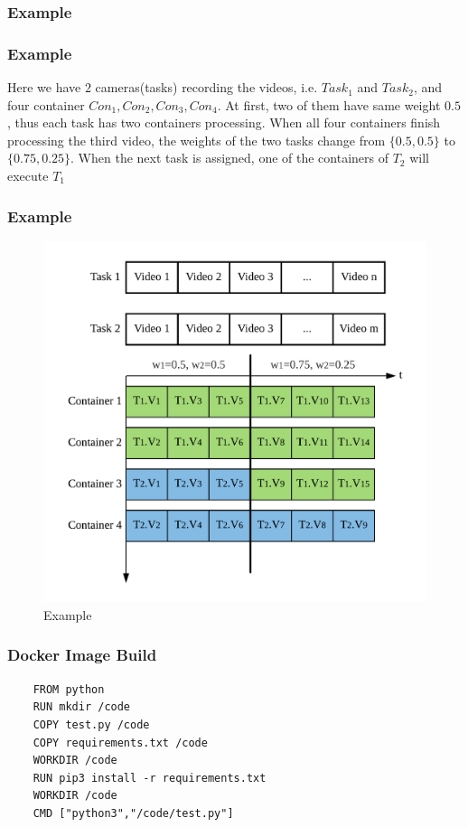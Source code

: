 \documentclass{beamer}
\begin{document}
\subsubsection{Example}
\begin{frame}
    \frametitle{Example} 
    Here we have $2$ cameras(tasks) recording the videos, i.e. $Task_1$ and $Task_2$, and four container $Con_1,Con_2,Con_3,Con_4$. At first, two of them have same weight $0.5$, thus each task has two containers processing. When all four containers finish processing the third video, the weights of the two tasks change from $\{0.5,0.5\}$ to $\{0.75,0.25\}$. When the next task is assigned, one of the containers of $T_2$ will execute $T_1$
\end{frame}
\begin{frame}
    \frametitle{Example} 
    \begin{figure}[H]
        \centering
        \includegraphics[width=.5\textwidth]{img/report4.png}
        \caption{Example}
        \label{img4} 
    \end{figure}
\end{frame}
\begin{frame}[fragile]
    \frametitle{Docker Image Build} 
\begin{lstlisting}
    FROM python
    RUN mkdir /code
    COPY test.py /code
    COPY requirements.txt /code
    WORKDIR /code
    RUN pip3 install -r requirements.txt
    WORKDIR /code
    CMD ["python3","/code/test.py"]
\end{lstlisting}
\end{frame}
\end{document}
